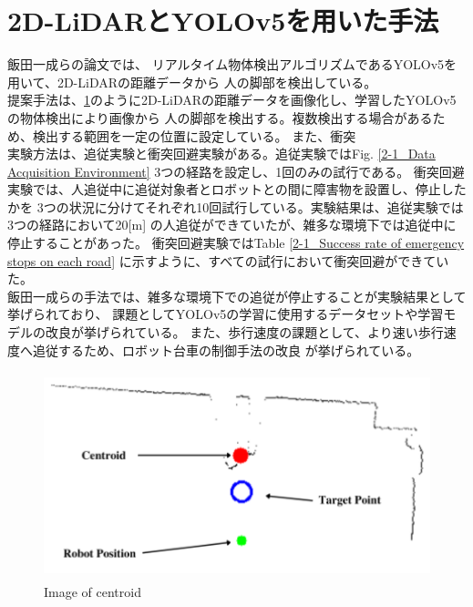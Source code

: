 \section{2D-LiDARとYOLOv5を用いた手法}
飯田一成らの論文\cite{深層学習を用いた人追従機能の開発}では、
リアルタイム物体検出アルゴリズムであるYOLOv5を用いて、2D-LiDARの距離データから
人の脚部を検出している。\\ \indent
提案手法は、\ref{2-1_Image of centroid}のように2D-LiDARの距離データを画像化し、学習したYOLOv5の物体検出により画像から
人の脚部を検出する。複数検出する場合があるため、検出する範囲を一定の位置に設定している。
また、衝突\\ \indent
実験方法は、追従実験と衝突回避実験がある。追従実験ではFig. \ref{2-1_Data Acquisition Environment} 3つの経路を設定し、1回のみの試行である。
衝突回避実験では、人追従中に追従対象者とロボットとの間に障害物を設置し、停止したかを
3つの状況に分けてそれぞれ10回試行している。実験結果は、追従実験では3つの経路において20[m]
の人追従ができていたが、雑多な環境下では追従中に停止することがあった。
衝突回避実験ではTable \ref{2-1_Success rate of emergency stops on each road}
に示すように、すべての試行において衝突回避ができていた。\\ \indent
飯田一成らの手法では、雑多な環境下での追従が停止することが実験結果として挙げられており、
課題としてYOLOv5の学習に使用するデータセットや学習モデルの改良が挙げられている。
また、歩行速度の課題として、より速い歩行速度へ追従するため、ロボット台車の制御手法の改良
が挙げられている。

\begin{figure}[h]
  \begin{center}
  \includegraphics[height=60mm,clip]{figure/2-1_Image-of-centroid.png}
  \caption{Image of centroid\cite{深層学習を用いた人追従機能の開発}}
  \label{2-1_Image of centroid}
  \end{center}
\end{figure}

